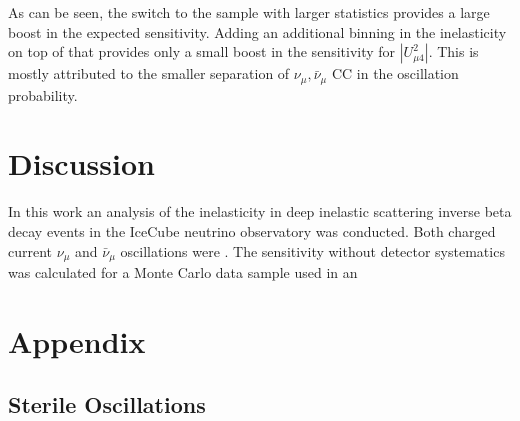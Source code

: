\documentclass[a4paper,12pt,numbered]{article}
\begin{document}
As can be seen, the switch to the sample with larger statistics provides a large boost in the expected sensitivity. Adding an additional binning in the inelasticity on top of that provides only a small boost in the sensitivity for $|U_{\mu 4}^2|$. This is mostly attributed to the smaller separation of $\nu_\mu, \bar{\nu}_\mu$ CC in the oscillation probability.


\section{Discussion}

In this work an analysis of the inelasticity in deep inelastic scattering inverse beta decay events in the IceCube neutrino observatory was conducted. Both charged current $\nu_\mu$ and $\bar{\nu}_\mu$ oscillations were . The sensitivity without detector systematics was calculated for a Monte Carlo data sample used in an





\appendix
\section{Appendix}
\subsection*{Sterile Oscillations}

\newpage\null\thispagestyle{empty}\newpage
\end{document}
